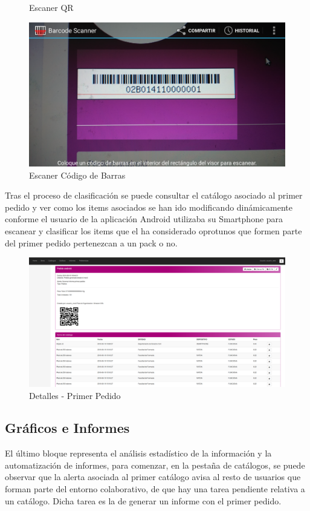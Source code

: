 \documentclass[a4paper,11pt]{book}
\begin{document}
\begin{figure}[H]
  \caption{Escaner QR\cite{propio}}
\endminipage\hfill
{}
  \includegraphics[width=\linewidth]{imagenes/pruebas/movil/movil16.png}
  \caption{Escaner Código de Barras\cite{propio}}
\endminipage\hfill
\end{figure}

Tras el proceso de clasificación se puede consultar el catálogo asociado al primer pedido y ver como los items asociados se han ido modificando dinámicamente conforme el usuario de la aplicación Android utilizaba su Smartphone para escanear y clasificar los items que el ha considerado oprotunos que formen parte del primer pedido pertenezcan a un pack o no. 

\begin{figure}[H] 
\centering 
\includegraphics[scale=0.2]{imagenes/pruebas/pedido.png}
\caption{ Detalles - Primer Pedido\cite{propio}}
\end{figure}

\subsection{ Gráficos e Informes}

El último bloque representa el análisis estadístico de la información y la automatización de informes, para comenzar, en la pestaña de catálogos, se puede observar que la alerta asociada al primer catálogo avisa al resto de usuarios que forman parte del entorno colaborativo, de que hay una tarea pendiente relativa a un catálogo. Dicha tarea es la de generar un informe con el primer pedido.
\end{document}
